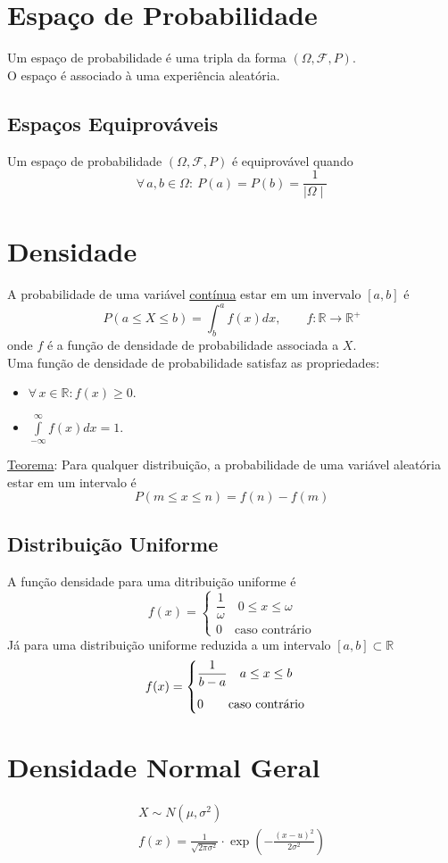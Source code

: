 \documentclass{article}
\begin{document}
\section{Espaço de Probabilidade}
Um espaço de probabilidade é uma tripla da forma $(\Omega, \mathcal{F}, P)$. \\
O espaço é associado à uma experiência aleatória.


\subsection{Espaços Equiprováveis}
Um espaço de probabilidade $(\Omega, \mathcal{F}, P)$ é equiprovável quando
\[ \forall \, a, b \in \Omega: \> P({a}) = P({b}) = \frac{1}{\mid \Omega \mid} \]



\section{Densidade}
A probabilidade de uma variável \uline{contínua} estar em um invervalo $[a,b]$ é
\[ P(a \leq X \leq b) = \int_b^a f(x) dx, \qquad f: \mathbb{R} \to \mathbb{R}^+ \]
onde $f$ é a função de densidade de probabilidade associada a $X$. \\[10pt]
Uma função de densidade de probabilidade satisfaz as propriedades:
\begin{itemize}
  \item $\forall\, x \in \mathbb{R}: f(x) \geq 0$.
  \item $\int\limits_{-\infty}^{\infty} f(x) dx = 1$.
\end{itemize}
\uline{Teorema}: Para qualquer distribuição, a probabilidade de uma variável aleatória estar em um intervalo é
\[ P(m \leq x \leq n) = f(n) - f(m) \]

\subsection{Distribuição Uniforme}
A função densidade para uma ditribuição uniforme é
\[
  f(x) = \begin{cases}
          \dfrac{1}{\omega} \quad 0 \leq x \leq \omega \\[10pt]
          0 \quad \text{caso contrário}
         \end{cases}
\]
Já para uma distribuição uniforme reduzida a um intervalo $[a,b] \subset \mathbb{R}$
\[
  f(x) = \begin{cases}
          \dfrac{1}{b - a} \quad a \leq x \leq b \\[10pt]
          0 \qquad \text{caso contrário}
         \end{cases} \\[10pt]
\]


\section{Densidade Normal Geral}
\begin{gather*}
  X \sim N(\mu, \sigma^2) \\[5pt]
  f(x) = \frac{1}{\sqrt{2 \pi \sigma^2}} \cdot \exp \left(- \frac{{(x - u)}^2}{2\sigma^2} \right)
\end{gather*}
\end{document}
